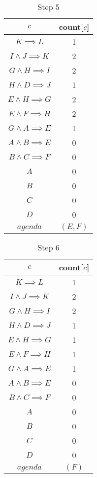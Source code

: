 \documentclass[12pt]{article}
\begin{document}
\begin{itemize}
\begin{table}[H]
\centering
\caption*{Step 5}
\label{my-label1}
\begin{tabular}{ c c }
\hline
$c$ & count[$c$]\\ \hline
$K \implies L$ & 1\\
$I \land J \implies K$ & 2\\
$G \land H \implies I$ & 2\\
$H \land D \implies J$ & 1\\
$E \land H \implies G$ & 2\\
$E \land F \implies H$ & 2\\
$G \land A \implies E$ & 1\\
$A \land B \implies E$ & 0\\
$B \land C \implies F$ & 0\\
$A$ & 0\\
$B$ & 0\\
$C$ & 0\\
$D$ & 0\\ \hline
$agenda$ & $(E, F)$
\end{tabular}
\end{table}
		
\begin{table}[H]
\centering
\caption*{Step 6}
\label{my-label1}
\begin{tabular}{ c c }
\hline
$c$ & count[$c$]\\ \hline
$K \implies L$ & 1\\
$I \land J \implies K$ & 2\\
$G \land H \implies I$ & 2\\
$H \land D \implies J$ & 1\\
$E \land H \implies G$ & 1\\
$E \land F \implies H$ & 1\\
$G \land A \implies E$ & 1\\
$A \land B \implies E$ & 0\\
$B \land C \implies F$ & 0\\
$A$ & 0\\
$B$ & 0\\
$C$ & 0\\
$D$ & 0\\ \hline
$agenda$ & $(F)$
\end{tabular}
\end{table}
		

\end{itemize}
\end{document}
